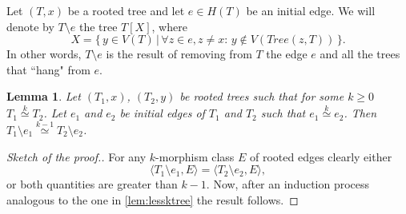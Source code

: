 \documentclass[11pt,notitlepage]{report}
\newtheorem{lemma}{Lemma}[chapter]
\theoremstyle{definition}
\newcommand{\morph}[1]{\stackrel{#1}{\simeq}}
\begin{document}
Let $(T,x)$ be a rooted tree and let $e\in H(T)$ be an initial edge.
We will denote by $T\setminus e$ the tree $T[X]$, where
\[ X= \{\, y\in V(T) \, | \, \forall z\in e, z\neq x: \, y\notin V(Tree(z,T)) \, \}.\]
In other words, $T\setminus e$ is the result of removing from $T$ the edge $e$ and
all the trees that ``hang" from $e$. 

\begin{lemma} \label{lem:minusedge}
	Let $(T_1,x)$, $(T_2, y)$ be rooted trees such that for some $k\geq 0$
	$T_1\morph{k} T_2$. Let $e_1$ and $e_2$ be initial edges of $T_1$ and $T_2$
	such that $e_1\morph{k} e_2$. Then $T_1\setminus e_1\morph{k-1} T_2\setminus e_2$.
\end{lemma}
\begin{proof}[Sketch of the proof.]
	For any $k$-morphism class $E$ of rooted edges clearly either
	\[\langle T_1\setminus e_1,E \rangle =\langle T_2\setminus e_2,E \rangle ,\]
	or both quantities are greater than $k-1$.
	Now, after an induction process analogous to the one in \cref{lem:lessktree}
	the result follows. 	
\end{proof}
\end{document}
